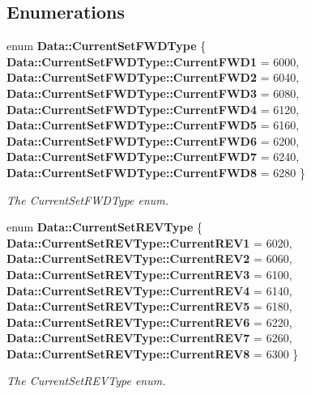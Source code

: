 \subsection*{Enumerations}
\begin{DoxyCompactItemize}
\item 
enum \textbf{ Data\+::\+Current\+Set\+F\+W\+D\+Type} \{ \newline
\textbf{ Data\+::\+Current\+Set\+F\+W\+D\+Type\+::\+Current\+F\+W\+D1} = 6000, 
\textbf{ Data\+::\+Current\+Set\+F\+W\+D\+Type\+::\+Current\+F\+W\+D2} = 6040, 
\textbf{ Data\+::\+Current\+Set\+F\+W\+D\+Type\+::\+Current\+F\+W\+D3} = 6080, 
\textbf{ Data\+::\+Current\+Set\+F\+W\+D\+Type\+::\+Current\+F\+W\+D4} = 6120, 
\newline
\textbf{ Data\+::\+Current\+Set\+F\+W\+D\+Type\+::\+Current\+F\+W\+D5} = 6160, 
\textbf{ Data\+::\+Current\+Set\+F\+W\+D\+Type\+::\+Current\+F\+W\+D6} = 6200, 
\textbf{ Data\+::\+Current\+Set\+F\+W\+D\+Type\+::\+Current\+F\+W\+D7} = 6240, 
\textbf{ Data\+::\+Current\+Set\+F\+W\+D\+Type\+::\+Current\+F\+W\+D8} = 6280
 \}\begin{DoxyCompactList}\small\item\em The Current\+Set\+F\+W\+D\+Type enum. \end{DoxyCompactList}
\item 
enum \textbf{ Data\+::\+Current\+Set\+R\+E\+V\+Type} \{ \newline
\textbf{ Data\+::\+Current\+Set\+R\+E\+V\+Type\+::\+Current\+R\+E\+V1} = 6020, 
\textbf{ Data\+::\+Current\+Set\+R\+E\+V\+Type\+::\+Current\+R\+E\+V2} = 6060, 
\textbf{ Data\+::\+Current\+Set\+R\+E\+V\+Type\+::\+Current\+R\+E\+V3} = 6100, 
\textbf{ Data\+::\+Current\+Set\+R\+E\+V\+Type\+::\+Current\+R\+E\+V4} = 6140, 
\newline
\textbf{ Data\+::\+Current\+Set\+R\+E\+V\+Type\+::\+Current\+R\+E\+V5} = 6180, 
\textbf{ Data\+::\+Current\+Set\+R\+E\+V\+Type\+::\+Current\+R\+E\+V6} = 6220, 
\textbf{ Data\+::\+Current\+Set\+R\+E\+V\+Type\+::\+Current\+R\+E\+V7} = 6260, 
\textbf{ Data\+::\+Current\+Set\+R\+E\+V\+Type\+::\+Current\+R\+E\+V8} = 6300
 \}\begin{DoxyCompactList}\small\item\em The Current\+Set\+R\+E\+V\+Type enum. \end{DoxyCompactList}
\end{DoxyCompactItemize}
